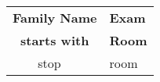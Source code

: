 \documentclass{article}
\renewcommand{\Large}{\fontsize{35.83}{45}\selectfont}
\renewcommand{\LARGE}{\fontsize{43}{54}\selectfont}
\begin{document}
\begin{center}
\LARGE \textbf{\theCourse\  \theExam}

\medskip

\Large
	\theExamDate \\
	\theExamTime
\end{center}

\vspace*{3ex}

\begin{longtable}{r@{ -- }l@{\qquad\qquad\qquad}l}
	\toprule
	\multicolumn{2}{c}{\textbf{Family Name} \qquad\qquad\mbox{}} & \textbf{Exam} \\
	\multicolumn{2}{c}{\textbf{starts with} \qquad\qquad\mbox{}} & \textbf{Room}\\
	\midrule
	\endhead
	\bottomrule
	\endfoot
{%
{{ start }} & {{ stop }} & {{ room }} {%
{%
\end{longtable}
\end{document}
